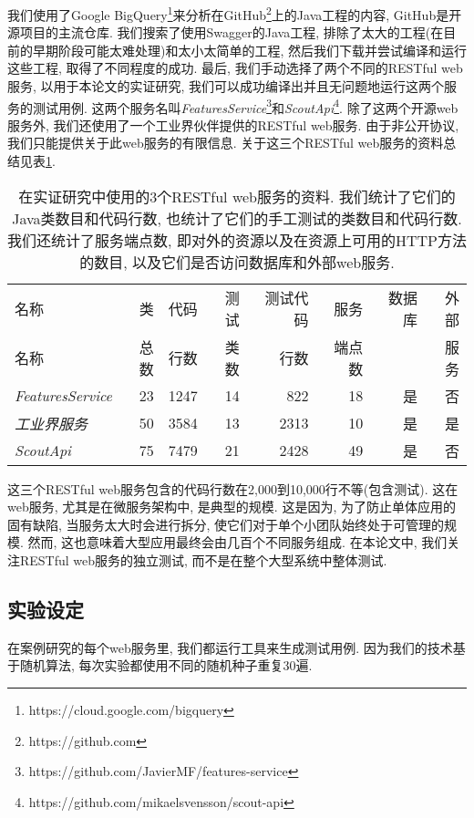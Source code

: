         我们使用了Google BigQuery\footnote{https://cloud.google.com/bigquery}来分析在GitHub\footnote{https://github.com}上的Java工程的内容, GitHub是开源项目的主流仓库. 我们搜索了使用Swagger的Java工程, 排除了太大的工程(在目前的早期阶段可能太难处理)和太小太简单的工程, 然后我们下载并尝试编译和运行这些工程, 取得了不同程度的成功. 最后, 我们手动选择了两个不同的RESTful web服务, 以用于本论文的实证研究, 我们可以成功编译出并且无问题地运行这两个服务的测试用例. 这两个服务名叫\textit{FeaturesService}\footnote{https://github.com/JavierMF/features-service}和\textit{ScoutApi}\footnote{https://github.com/mikaelsvensson/scout-api}. 除了这两个开源web服务外, 我们还使用了一个工业界伙伴提供的RESTful web服务. 由于非公开协议, 我们只能提供关于此web服务的有限信息. 关于这三个RESTful web服务的资料总结见表\ref{table1}. 
        
  \begin{table}
      \small
      \centering
      \begin{tabular}{lrrrrrrr}
          \toprule
            名称 & 类 & 代码 & 测试 & 测试代码 & 服务 & 数据库 & 外部 \\
            名称 & 总数 & 行数 & 类数 & 行数 & 端点数 &  & 服务 \\
            \midrule
            \textit{FeaturesService} & 23 & 1247 & 14 & 822 & 18 & 是 & 否 \\
            \textit{工业界服务} & 50 & 3584 & 13 & 2313 & 10 & 是 & 是 \\
            \textit{ScoutApi} & 75 & 7479 & 21 & 2428 & 49 & 是 & 否 \\
            \bottomrule
        \end{tabular}
        \caption{在实证研究中使用的3个RESTful web服务的资料. 我们统计了它们的Java类数目和代码行数, 也统计了它们的手工测试的类数目和代码行数. 我们还统计了服务端点数, 即对外的资源以及在资源上可用的HTTP方法的数目, 以及它们是否访问数据库和外部web服务.}
        \label{table1}
    \end{table}

        这三个RESTful web服务包含的代码行数在2,000到10,000行不等(包含测试). 这在web服务, 尤其是在微服务架构中, 是典型的规模\cite{newman2015building}. 这是因为, 为了防止单体应用的固有缺陷, 当服务太大时会进行拆分, 使它们对于单个小团队始终处于可管理的规模. 然而, 这也意味着大型应用最终会由几百个不同服务组成. 在本论文中, 我们关注RESTful web服务的独立测试, 而不是在整个大型系统中整体测试. 
    
    \subsection{实验设定}
      在案例研究的每个web服务里, 我们都运行工具来生成测试用例. 因为我们的技术基于随机算法, 每次实验都使用不同的随机种子重复30遍. 
        
